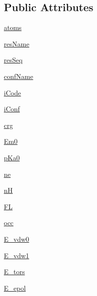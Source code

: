 \subsection*{Public Attributes}
\begin{DoxyCompactItemize}
\item 
\hyperlink{classxmccepy_1_1mp_1_1_c_o_n_f_o_r_m_e_r_a6a748e760bc097c1560578f42a9f857f}{atoms}
\item 
\hyperlink{classxmccepy_1_1mp_1_1_c_o_n_f_o_r_m_e_r_a9e5bf147326267319ff6e530c6fe2184}{res\-Name}
\item 
\hyperlink{classxmccepy_1_1mp_1_1_c_o_n_f_o_r_m_e_r_abd94248291d7e1014b784a61572b9b56}{res\-Seq}
\item 
\hyperlink{classxmccepy_1_1mp_1_1_c_o_n_f_o_r_m_e_r_a7200c512bdf3481f4244005873802833}{conf\-Name}
\item 
\hyperlink{classxmccepy_1_1mp_1_1_c_o_n_f_o_r_m_e_r_afc8af5d1e1ca01bc54162eef3076c0e7}{i\-Code}
\item 
\hyperlink{classxmccepy_1_1mp_1_1_c_o_n_f_o_r_m_e_r_a5e08044df96e2efc98d27d11dad2acc0}{i\-Conf}
\item 
\hyperlink{classxmccepy_1_1mp_1_1_c_o_n_f_o_r_m_e_r_a80e8729d25aa77487916dfc0b0be6c7d}{crg}
\item 
\hyperlink{classxmccepy_1_1mp_1_1_c_o_n_f_o_r_m_e_r_a62ff7372f23a1c40ea1967aaffad993c}{Em0}
\item 
\hyperlink{classxmccepy_1_1mp_1_1_c_o_n_f_o_r_m_e_r_a6b1bf83b15461d60baa91de328d195ce}{p\-Ka0}
\item 
\hyperlink{classxmccepy_1_1mp_1_1_c_o_n_f_o_r_m_e_r_ab0377ce0611af60ca84fa253d32289ca}{ne}
\item 
\hyperlink{classxmccepy_1_1mp_1_1_c_o_n_f_o_r_m_e_r_aef85f7fcfb8665f154e0fad915dbac5e}{n\-H}
\item 
\hyperlink{classxmccepy_1_1mp_1_1_c_o_n_f_o_r_m_e_r_a54266cbd09ba1b62ac724a688a077623}{F\-L}
\item 
\hyperlink{classxmccepy_1_1mp_1_1_c_o_n_f_o_r_m_e_r_aaf6ca8e069b34e52bfb9f5e95c24b859}{occ}
\item 
\hyperlink{classxmccepy_1_1mp_1_1_c_o_n_f_o_r_m_e_r_a6d2a83a118c9117dc938e954e7e5cac6}{E\-\_\-vdw0}
\item 
\hyperlink{classxmccepy_1_1mp_1_1_c_o_n_f_o_r_m_e_r_ae98aded8558a5101a760bb9b60101bac}{E\-\_\-vdw1}
\item 
\hyperlink{classxmccepy_1_1mp_1_1_c_o_n_f_o_r_m_e_r_a442b37096eecb715ef0637298e647a27}{E\-\_\-tors}
\item 
\hyperlink{classxmccepy_1_1mp_1_1_c_o_n_f_o_r_m_e_r_ab3a58e71ca1eff5c19a49c3e7ed4c682}{E\-\_\-epol}

\end{DoxyCompactItemize}
